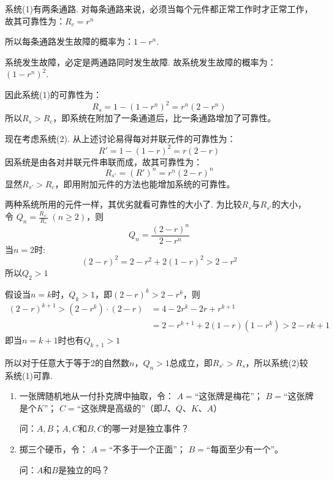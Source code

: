 \begin{solution}
    系统(1)有两条通路. 对每条通路来说，必须当每个元件都正常工作时才正常工作，故其可靠性为：$R_c=r^n$

    所以每条通路发生故障的概率为：$1-r^n$.

    系统发生故障，必定是两通路同时发生故障. 故系统发生故障的概率为：$(1-r^n)^2$.

    因此系统(1)的可靠性为：$$R_s=1-(1-r^n)^2=r^n(2-r^n)$$
    所以$R_s>R_c$，即系统在附加了一条通道后，比一条通路增加了可靠性。

    现在考虑系统(2). 从上述讨论易得每对并联元件的可靠性为：$$R'=1-(1-r)^2=r(2-r)$$
    因系统是由各对并联元件串联而成，故其可靠性为：
\[    R_{s'}=(R')^n=r^n(2-r)^n\]
    显然$R_{s'}>R_c$，即用附加元件的方法也能增加系统的可靠性。

两种系统所用的元件一样，其优劣就看可靠性的大小了. 为比较$R_s$与$R_{s'}$的大小，令
$Q_n=\frac{R_{s'}}{R_s}\; (n\ge 2)$，则
\[Q_n=\frac{(2-r)^n}{2-r^n}\]
当$n=2$时:
\[(2-r)^2=2-r^2+2(1-r)^2>2-r^2\]
所以$Q_2>1$

假设当$n=k$时，$Q_k>1$，即$(2-r)^k>2-r^k$，则
\[\begin{split}
 (2-r)^{k+1}>(2-r^k)\cdot (2-r)&=4-2r^k-2r+r^{k+1}\\
&=2-r^{k+1}+2(1-r)(1-r^k)>2-rk+1   
\end{split}\]
即当$n=k+1$时也有$Q_{k+1}>1$

所以对于任意大于等于2的自然数$n$，$Q_n>1$总成立，即$R_{s'}>R_s$，所以系统(2)较系统(1)可靠.
\end{solution}

\begin{ex}
\begin{enumerate}
    \item 一张牌随机地从一付扑克牌中抽取，令：    $A=$“这张牌是梅花”；    $B=$“这张牌是个$K$”；    $C=$“这张牌是高级的”（即$J$、$Q$、$K$、$A$）
    
    问：$A,B$；$A,C$和$B,C$的哪一对是独立事件？
    
    \item 掷三个硬币，令：    $A=$“不多于一个正面”；    $B=$“每面至少有一个”。
    
    问：$A$和$B$是独立的吗？
\end{enumerate}
\end{ex}

